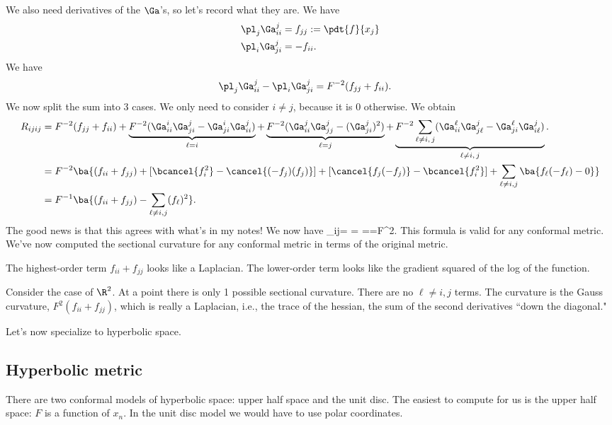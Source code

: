 We also need derivatives of the $\Ga$'s, so let's record what they are. We have 
\begin{align*}
\pl_j \Ga_{ii}^j&=f_{jj}:=\pdt{f}{x_j}\\
\pl_i \Ga_{ji}^j&=-f_{ii}.
\end{align*}
We have
\begin{align*}
\pl_j \Ga_{ii}^j -\pl_i \Ga_{ji}^j&=F^{-2} (f_{jj}+f_{ii}).
\end{align*}
We now split the sum into 3 cases. We only need to consider $i\ne j$, because it is 0 otherwise. 
We obtain %
\begin{align*}
R_{ijij}&=F^{-2} (f_{jj}+f_{ii})
+\underbrace{F^{-2}(\Ga_{ii}^i \Ga_{ji}^j - \Ga_{ji}^i \Ga_{ii}^j)}_{\ell=i}
+\underbrace{F^{-2}(\Ga_{ii}^j \Ga_{jj}^j -(\Ga_{ji}^j)^2)}_{\ell=j}
+\underbrace{F^{-2}\sum_{\ell\ne i,\,j}(\Ga_{ii}^{\ell} \Ga_{j\ell}^j -\Ga_{ji}^{\ell}\Ga_{i\ell}^j)}_{\ell\ne i,\,j}.\\
&=F^{-2}\ba{(f_{ii}+f_{jj}) + [\bcancel{f_i^2} - \cancel{(-f_j)(f_j)}] + [\cancel{f_j(-f_j)}-\bcancel{f_i^2}] + \sum_{\ell\ne i,j} \ba{f_{\ell} (-f_{\ell})-0}}\\
&= F^{-1}\ba{(f_{ii}+f_{jj})-\sum_{\ell\ne i,j} (f_{\ell})^2}.
\end{align*}
The good news is that this agrees with what's in my notes! We now have 
\kappa_{ij}= = ==F^2.
\eeq
This formula is valid for any conformal metric. We've now computed the sectional curvature for any conformal metric in terms of the original metric.

The highest-order term $f_{ii}+f_{jj}$ looks like a Laplacian. The lower-order term looks like the gradient squared of the log of the function.

\begin{ex}
Consider the case of $\R^2$. At a point there is only 1 possible sectional curvature. There are no $\ell\ne i,j$ terms. The curvature is the Gauss curvature, $F^2(f_{ii}+f_{jj})$, which is really a Laplacian, i.e., the trace of the hessian, the sum of the second derivatives ``down the diagonal."
\end{ex}

Let's now specialize to hyperbolic space.
\subsection{Hyperbolic metric}
There are two conformal models of hyperbolic space: upper half space and the unit disc. The easiest to compute for us is the upper half space: $F$ is a function of $x_n$. 
In the unit disc model we would have to use polar coordinates. 

